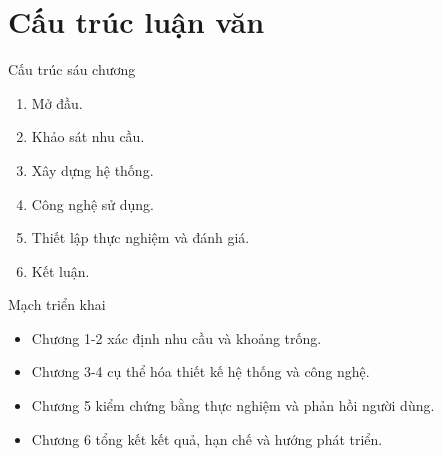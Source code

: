 \documentclass[aspectratio=169]{beamer}
\begin{document}
\section{Cấu trúc luận văn}
\begin{frame}{Cấu trúc sáu chương}
\begin{enumerate}
\item Mở đầu.
\item Khảo sát nhu cầu.
\item Xây dựng hệ thống.
\item Công nghệ sử dụng.
\item Thiết lập thực nghiệm và đánh giá.
\item Kết luận.
\end{enumerate}
\end{frame}
\begin{frame}{Mạch triển khai}
\begin{itemize}
\item Chương 1-2 xác định nhu cầu và khoảng trống.
\item Chương 3-4 cụ thể hóa thiết kế hệ thống và công nghệ.
\item Chương 5 kiểm chứng bằng thực nghiệm và phản hồi người dùng.
\item Chương 6 tổng kết kết quả, hạn chế và hướng phát triển.
\end{itemize}
\end{frame}
\end{document}

